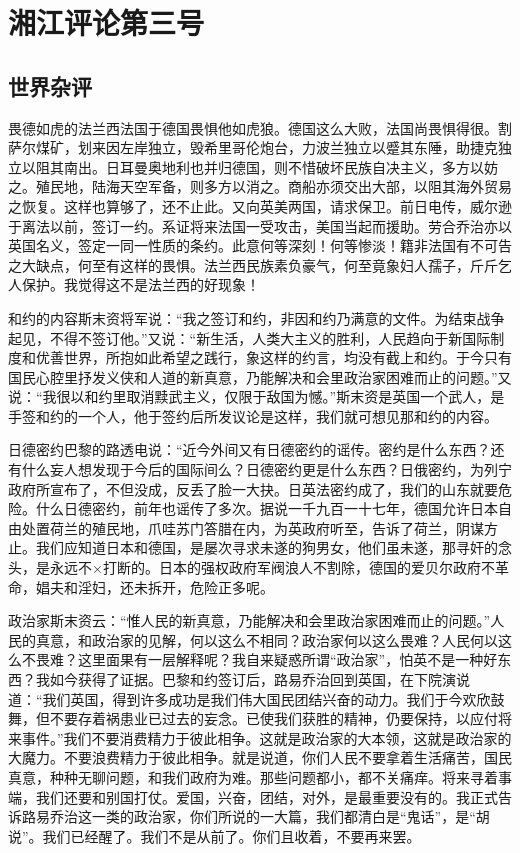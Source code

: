 \section{湘江评论第三号}

\subsection{世界杂评}

畏德如虎的法兰西法国于德国畏惧他如虎狼。德国这么大败，法国尚畏惧得很。割萨尔煤矿，划来因左岸独立，毁希里哥伦炮台，力波兰独立以蹙其东陲，助捷克独立以阻其南出。日耳曼奥地利也并归德国，则不惜破坏民族自决主义，多方以妨之。殖民地，陆海天空军备，则多方以消之。商船亦须交出大部，以阻其海外贸易之恢复。这样也算够了，还不止此。又向英美两国，请求保卫。前日电传，威尔逊于离法以前，签订一约。系证将来法国一受攻击，美国当起而援助。劳合乔治亦以英国名义，签定一同一性质的条约。此意何等深刻！何等惨淡！籍非法国有不可告之大缺点，何至有这样的畏惧。法兰西民族素负豪气，何至竟象妇人孺子，斤斤乞人保护。我觉得这不是法兰西的好现象！

和约的内容斯末资将军说：“我之签订和约，非因和约乃满意的文件。为结束战争起见，不得不签订他。”又说：“新生活，人类大主义的胜利，人民趋向于新国际制度和优善世界，所抱如此希望之践行，象这样的约言，均没有截上和约。于今只有国民心腔里抒发义侠和人道的新真意，乃能解决和会里政治家困难而止的问题。”又说：“我很以和约里取消黩武主义，仅限于敌国为憾。”斯末资是英国一个武人，是手签和约的一个人，他于签约后所发议论是这样，我们就可想见那和约的内容。

日德密约巴黎的路透电说：“近今外间又有日德密约的谣传。密约是什么东西？还有什么妄人想发现于今后的国际间么？日德密约更是什么东西？日俄密约，为列宁政府所宣布了，不但没成，反丢了脸一大抉。日英法密约成了，我们的山东就要危险。什么日德密约，前年也谣传了多次。据说一千九百一十七年，德国允许日本自由处置荷兰的殖民地，爪哇苏门答腊在内，为英政府听至，告诉了荷兰，阴谋方止。我们应知道日本和德国，是屡次寻求未遂的狗男女，他们虽未遂，那寻奸的念头，是永远不×打断的。日本的强权政府军阀浪人不割除，德国的爱贝尔政府不革命，娼夫和淫妇，还未拆开，危险正多呢。

政治家斯末资云：“惟人民的新真意，乃能解决和会里政治家困难而止的问题。”人民的真意，和政治家的见解，何以这么不相同？政治家何以这么畏难？人民何以这么不畏难？这里面果有一层解释呢？我自来疑惑所谓“政治家”，怕英不是一种好东西？我如今获得了证据。巴黎和约签订后，路易乔治回到英国，在下院演说道：“我们英国，得到许多成功是我们伟大国民团结兴奋的动力。我们于今欢欣鼓舞，但不要存着祸患业已过去的妄念。已使我们获胜的精神，仍要保持，以应付将来事件。”我们不要消费精力于彼此相争。这就是政治家的大本领，这就是政治家的大魔力。不要浪费精力于彼此相争。就是说道，你们人民不要拿着生活痛苦，国民真意，种种无聊问题，和我们政府为难。那些问题都小，都不关痛痒。将来寻着事端，我们还要和别国打仗。爱国，兴奋，团结，对外，是最重要没有的。我正式告诉路易乔治这一类的政治家，你们所说的一大篇，我们都清白是“鬼话”，是“胡说”。我们已经醒了。我们不是从前了。你们且收着，不要再来罢。

